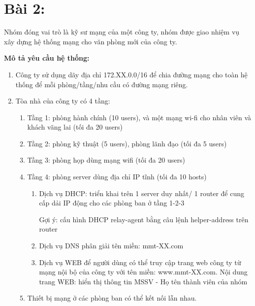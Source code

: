 \section{Bài 2:}

Nhóm đóng vai trò là kỹ sư mạng của một công ty, nhóm được giao nhiệm vụ xây dựng hệ thống mạng cho văn phòng mới của công ty.

\bf Mô tả yêu cầu hệ thống:
\begin{enumerate}
\it\item Công ty sử dụng dãy địa chỉ 172.XX.0.0/16 để chia đường mạng cho toàn hệ thống để mỗi phòng/tầng/nhu cầu có đường mạng riêng.

\it\item Tòa nhà của công ty có 4 tầng:
\begin{enumerate}
\sc \item Tầng 1: \rm phòng hành chính (10 users), và một mạng wi-fi cho nhân viên và khách vãng lai (tối đa 20 users)

\sc \item Tầng 2: \rm phòng kỹ thuật (5 users), phòng lãnh đạo (tối đa 5 users)

\sc \item Tầng 3: \rm phòng họp dùng mạng wifi (tối đa 20 users)

\sc \item Tầng 4: \rm phòng server dùng địa chỉ IP tĩnh (tối đa 10 hosts)
\begin{enumerate}
\tt \item Dịch vụ DHCP: \rm triển khai trên 1 server duy nhất/ 1 router để cung cấp dải IP động cho các phòng ban ở tầng 1-2-3

\rm Gợi ý: cấu hình DHCP relay-agent bằng câu lệnh helper-address trên router

\tt \item Dịch vụ DNS phân giải tên miền: \rm mmt-XX.com

\tt \item Dịch vụ WEB \rm để người dùng có thể truy cập trang web công ty từ mạng nội bộ của công ty với tên miền: www.mmt-XX.com. Nội dung trang WEB: hiển thị thông tin MSSV - Họ tên thành viên của nhóm
\end{enumerate}

\sc \item Thiết bị mạng ở các phòng ban có thể kết nối lẫn nhau.
\end{enumerate}
\end{enumerate}

